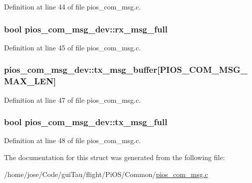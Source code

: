 Definition at line 44 of file pios\-\_\-com\-\_\-msg.\-c.

\hypertarget{structpios__com__msg__dev_a38043f348bd99edfb297de34bda052e4}{
\subsubsection[{rx\-\_\-msg\-\_\-full}]{ {\bf bool} pios\-\_\-com\-\_\-msg\-\_\-dev\-::rx\-\_\-msg\-\_\-full}}\label{structpios__com__msg__dev_a38043f348bd99edfb297de34bda052e4}


Definition at line 45 of file pios\-\_\-com\-\_\-msg.\-c.

\hypertarget{structpios__com__msg__dev_a7155e93159cd5cfcd394884b8ceaa78b}{
\subsubsection[{tx\-\_\-msg\-\_\-buffer}]{ pios\-\_\-com\-\_\-msg\-\_\-dev\-::tx\-\_\-msg\-\_\-buffer\mbox{[}P\-I\-O\-S\-\_\-\-C\-O\-M\-\_\-\-M\-S\-G\-\_\-\-M\-A\-X\-\_\-\-L\-E\-N\mbox{]}}}\label{structpios__com__msg__dev_a7155e93159cd5cfcd394884b8ceaa78b}


Definition at line 47 of file pios\-\_\-com\-\_\-msg.\-c.

\hypertarget{structpios__com__msg__dev_acfd2f035cc532f5f6869277283be397b}{
\subsubsection[{tx\-\_\-msg\-\_\-full}]{ {\bf bool} pios\-\_\-com\-\_\-msg\-\_\-dev\-::tx\-\_\-msg\-\_\-full}}\label{structpios__com__msg__dev_acfd2f035cc532f5f6869277283be397b}


Definition at line 48 of file pios\-\_\-com\-\_\-msg.\-c.



The documentation for this struct was generated from the following file\-:\begin{DoxyCompactItemize}
\item 
/home/jose/\-Code/gui\-Tau/flight/\-Pi\-O\-S/\-Common/\hyperlink{pios__com__msg_8c}{pios\-\_\-com\-\_\-msg.\-c}\end{DoxyCompactItemize}
